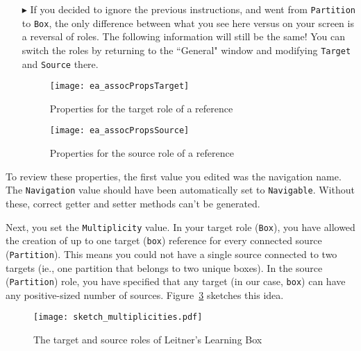 \begin{itemize}
\vspace{0.5cm}

\item[$\blacktriangleright$] If you decided to ignore the previous instructions, and went from \texttt{Partition} to \texttt{Box}, the only difference between
what you see here versus on your screen is a reversal of roles. The following information will still be the same! You can switch the roles by returning to the 
``General" window and modifying \texttt{Target} and \texttt{Source} there. 
\vspace{1cm}

\begin{figure}[htbp]
	\centering
	  \texttt{[image: ea\_assocPropsTarget]}
	\caption{Properties for the target role of a reference}
	\label{fig:role_target}
\end{figure}
\FloatBarrier

\begin{figure}[htbp]
	\centering
    \texttt{[image: ea\_assocPropsSource]}
	\caption{Properties for the source role of a reference}
	\label{fig:role_source}
\end{figure}
\FloatBarrier

\end{itemize}

To review these properties, the first value you edited was the navigation name. The \texttt{Navigation} value should have been automatically set to
\texttt{Navigable}. Without these, correct getter and setter methods can't be generated.

\vspace{0.5cm}

Next, you set the \texttt{Multiplicity} value. In your target role (\texttt{Box}), you have allowed the creation of up to
one target (\texttt{box}) reference for every connected source (\texttt{Partition}). This means you could not have a single source connected to two targets
(ie., one partition that belongs to two unique boxes). In the source (\texttt{Partition}) role, you have specified that any target (in our case, \texttt{box})
can have any positive-sized number of sources. Figure~\ref{fig:sketch_roles} sketches this idea.

\vspace{0.5cm}

\begin{figure}[htbp]
	\centering
    \texttt{[image: sketch\_multiplicities.pdf]}
	\caption{The target and source roles of Leitner's Learning Box}
	\label{fig:sketch_roles}
\end{figure}
\FloatBarrier

